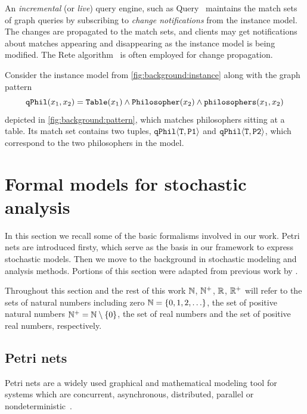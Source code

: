 An \emph{incremental} (or \emph{live}) query engine, such as  Query~\citep{Ujhelyi15incquery} maintains the match sets of graph queries by subscribing to \emph{change notifications} from the instance model. The changes are propagated to the match sets, and clients may get notifications about matches appearing and disappearing as the instance model is being modified. The Rete algorithm~\citep{Forgy82rete} is often employed for change propagation.

\begin{runningExample}
  Consider the instance model from \vref{fig:background:instance} along with the graph pattern
  \begin{equation}
    \texttt{\upshape qPhil}(x_1, x_2) = \texttt{\upshape Table}(x_1) \land \texttt{\upshape Philosopher}(x_2) \land \texttt{\upshape philosophers}(x_1, x_2) 
  \end{equation}
  depicted in \vref{fig:background:pattern}, which matches philosophers sitting at a table. Its match set contains two tuples, \(\texttt{\upshape qPhil}\langle \texttt{\upshape T}, \texttt{\upshape P1}\rangle\) and \(\texttt{\upshape qPhil}\langle \texttt{\upshape T}, \texttt{\upshape P2}\rangle\), which correspond to the two philosophers in the model.
\end{runningExample}

\section{Formal models for stochastic analysis}

In this section we recall some of the basic formalisms involved in our work. Petri nets are introduced firsty, which serve as the basis in our framework to express stochastic models. Then we move to the background in stochastic modeling and analysis methods. Portions of this section were adapted from previous work by \citet[Chapter~2]{Klenik15configurable}.

Throughout this section and the rest of this work \(\mathbb{N}\), \(\mathbb{N}^{+}\), \(\mathbb{R}\), \(\mathbb{R}^{+}\) will refer to the sets of natural numbers including zero \(\mathbb{N} = \{0, 1, 2, \ldots\}\), the set of positive natural numbers \(\mathbb{N}^{+} = \mathbb{N} \setminus \{0\}\), the set of real numbers and the set of positive real numbers, respectively.

\subsection{Petri nets}
\label{ssec:background:petri-nets}

Petri nets are a widely used graphical and mathematical modeling tool for systems which are concurrent, asynchronous, distributed, parallel or nondeterministic~\citep{Murata89petri}.

